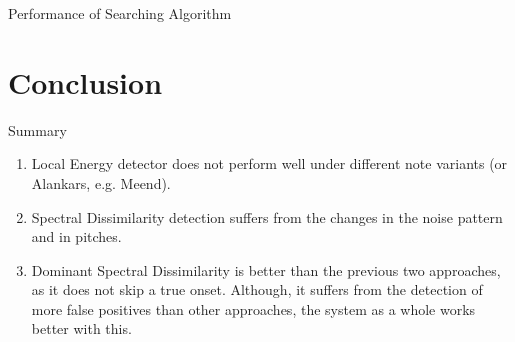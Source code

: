 \documentclass[10pt]{beamer}
\begin{document}
\begin{frame}{Performance of Searching Algorithm}

\begin{table}
\centering
\caption{Details of Searching Output using hummed version of \textit{Jingle Bells}}
\end{table}
\end{frame}

\section{Conclusion}

\begin{frame}{Summary}
\begin{enumerate}
    \item Local Energy detector does not perform well under different note variants (or Alankars, e.g. Meend).
    \item Spectral Dissimilarity detection suffers from the changes in the noise pattern and in pitches.
    \item Dominant Spectral Dissimilarity is better than the previous two approaches, as it does not skip a true onset. Although, it suffers from the detection of more false positives than other approaches, the system as a whole works better with this.
\end{enumerate}
\end{frame}
\end{document}
